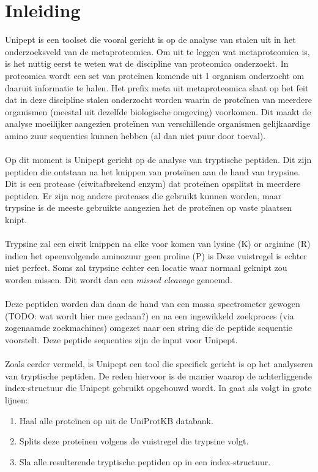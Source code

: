\documentclass[11pt,dutch,faculty=we,layout=titlefont,underline=false,titleUppercase=true,titleUnderline=true]{ugent2016-report}
\begin{document}
    \section{Inleiding}
    Unipept is een toolset die vooral gericht is op de analyse van stalen uit in het onderzoeksveld van de metaproteomica.
    Om uit te leggen wat metaproteomica is, is het nuttig eerst te weten wat de discipline van proteomica onderzoekt.
    In proteomica wordt een set van proteïnen komende uit 1 organism onderzocht om daaruit informatie te halen.
    Het prefix meta uit metaproteomica slaat op het feit dat in deze discipline stalen onderzocht worden waarin de proteïnen van meerdere organismen (meestal uit dezelfde biologische omgeving) voorkomen.
    Dit maakt de analyse moeilijker aangezien proteïnen van verschillende organismen gelijkaardige amino zuur sequenties kunnen hebben (al dan niet puur door toeval).
    \\ \\
    Op dit moment is Unipept gericht op de analyse van tryptische peptiden.
    Dit zijn peptiden die ontstaan na het knippen van proteïnen aan de hand van trypsine.
    Dit is een protease (eiwitafbrekend enzym) dat proteïnen opsplitst in meerdere peptiden.
    Er zijn nog andere proteases die gebruikt kunnen worden, maar trypsine is de meeste gebruikte aangezien het de proteïnen op vaste plaatsen knipt.
    \\ \\
    Trypsine zal een eiwit knippen na elke voor komen van lysine (K) or arginine (R) indien het opeenvolgende aminozuur geen proline (P) is
    Deze vuistregel is echter niet perfect.
    Soms zal trypsine echter een locatie waar normaal geknipt zou worden missen.
    Dit wordt dan een \textit{missed cleavage} genoemd.
    \\ \\
    Deze peptiden worden dan daan de hand van een massa spectrometer gewogen (TODO: wat wordt hier mee gedaan?) en na een ingewikkeld zoekproces (via zogenaamde zoekmachines) omgezet naar een string die de peptide sequentie voorstelt.
    Deze peptide sequenties zijn de input voor Unipept.
    \\ \\
    Zoals eerder vermeld, is Unipept een tool die specifiek gericht is op het analyseren van tryptische peptiden.
    De reden hiervoor is de manier waarop de achterliggende index-structuur die Unipept gebruikt opgebouwd wordt.
    In gaat als volgt in grote lijnen:
    \begin{enumerate}
        \item Haal alle proteïnen op uit de UniProtKB databank.
        \item Splits deze proteïnen volgens de vuistregel die trypsine volgt.
        \item Sla alle resulterende tryptische peptiden op in een index-structuur.
    \end{enumerate}
\end{document}

